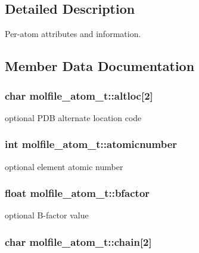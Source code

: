\subsection{\-Detailed \-Description}
\-Per-\/atom attributes and information. 

\subsection{\-Member \-Data \-Documentation}
\hypertarget{structmolfile__atom__t_a1073f97a075a5a512751cb321eb1a35f}{
\subsubsection[{altloc}]{\setlength{\rightskip}{0pt plus 5cm}char {\bf molfile\-\_\-atom\-\_\-t\-::altloc}\mbox{[}2\mbox{]}}}\label{structmolfile__atom__t_a1073f97a075a5a512751cb321eb1a35f}
optional \-P\-D\-B alternate location code \hypertarget{structmolfile__atom__t_a2c7410479520c3abf66a472974c620f6}{
\subsubsection[{atomicnumber}]{\setlength{\rightskip}{0pt plus 5cm}int {\bf molfile\-\_\-atom\-\_\-t\-::atomicnumber}}}\label{structmolfile__atom__t_a2c7410479520c3abf66a472974c620f6}
optional element atomic number \hypertarget{structmolfile__atom__t_a7255519f1dc407eacebf3a74c6282ae9}{
\subsubsection[{bfactor}]{\setlength{\rightskip}{0pt plus 5cm}float {\bf molfile\-\_\-atom\-\_\-t\-::bfactor}}}\label{structmolfile__atom__t_a7255519f1dc407eacebf3a74c6282ae9}
optional \-B-\/factor value \hypertarget{structmolfile__atom__t_a4788ad19cb3c8de63f4d3caf25b7469a}{
\subsubsection[{chain}]{\setlength{\rightskip}{0pt plus 5cm}char {\bf molfile\-\_\-atom\-\_\-t\-::chain}\mbox{[}2\mbox{]}}}\label{structmolfile__atom__t_a4788ad19cb3c8de63f4d3caf25b7469a}

